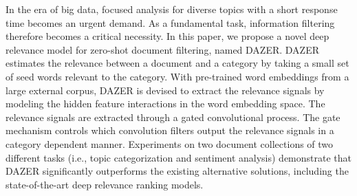 In the era of big data, focused analysis for diverse topics with a short response time becomes an urgent demand. As a fundamental task, information filtering therefore becomes a critical necessity. In this paper, we propose a novel deep relevance model for zero-shot document filtering, named DAZER. DAZER estimates the relevance between a document and a category by taking a small set of seed words relevant to the category. With pre-trained word embeddings from a large external corpus, DAZER is devised to extract the relevance signals by modeling the hidden feature interactions in the word embedding space. The relevance signals are extracted through a gated convolutional process. The gate mechanism controls which convolution filters output the relevance signals in a category dependent manner. Experiments on two document collections of two different tasks (i.e., topic categorization and sentiment analysis) demonstrate that DAZER significantly outperforms the existing alternative solutions, including the state-of-the-art deep relevance ranking models.
